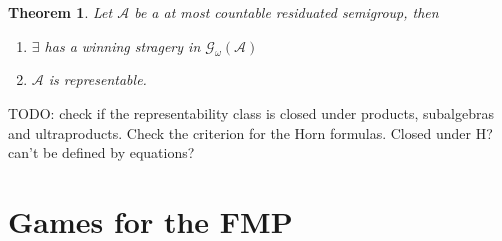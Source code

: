 \documentclass[a4paper]{article}
\theoremstyle{defin}
\theoremstyle{theorem}
\newtheorem{theorem}{Theorem}
\theoremstyle{claim}
\theoremstyle{prop}
\theoremstyle{lemma}
\theoremstyle{fact}
\theoremstyle{ex}
\theoremstyle{col}
\begin{document}
\begin{theorem}

Let $\mathcal{A}$ be a at most countable residuated semigroup, then

\begin{enumerate}
\item $\exists$ has a winning stragery in $\mathcal{G}_{\omega}(\mathcal{A})$
\item $\mathcal{A}$ is representable.
\end{enumerate}
\end{theorem}

TODO: check if the representability class is closed under products, subalgebras and ultraproducts. Check the criterion for the Horn formulas. Closed under H? can't be defined by equations?

\section{Games for the FMP}



\end{document}
